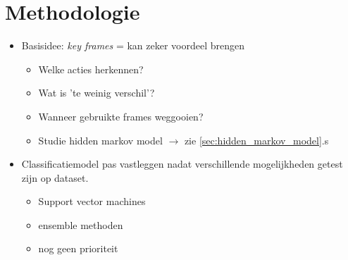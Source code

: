 \chapter{Methodologie}
\label{ch:methodologie}

\begin{itemize}
	\item Basisidee: \textit{key frames} = kan zeker voordeel brengen
	\begin{itemize}
		\item Welke acties herkennen? 
		\item Wat is 'te weinig verschil'? 
		\item Wanneer gebruikte frames weggooien? 
		\item Studie hidden markov model $\rightarrow$ zie \ref{sec:hidden_markov_model}.s
	\end{itemize}
	\item Classificatiemodel pas vastleggen nadat verschillende mogelijkheden getest zijn op dataset.
	\begin{itemize}
		\item Support vector machines
		\item ensemble methoden
		\item nog geen prioriteit
	\end{itemize}
\end{itemize}